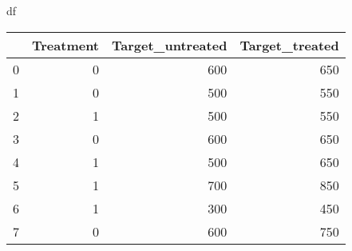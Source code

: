\caption{df}
\label{tab:sample_data}
\begin{tabular}{lrrr}
\toprule
 & Treatment & Target\_untreated & Target\_treated \\
\midrule
0 & 0 & 600 & 650 \\
1 & 0 & 500 & 550 \\
2 & 1 & 500 & 550 \\
3 & 0 & 600 & 650 \\
4 & 1 & 500 & 650 \\
5 & 1 & 700 & 850 \\
6 & 1 & 300 & 450 \\
7 & 0 & 600 & 750 \\
\bottomrule
\end{tabular}
